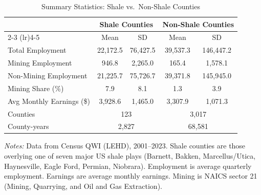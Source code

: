 \begin{table}[H]
\centering
\caption{Summary Statistics: Shale vs.\ Non-Shale Counties}
\begin{threeparttable}
\begin{tabular}{lcccc}
\toprule
 & \multicolumn{2}{c}{Shale Counties} & \multicolumn{2}{c}{Non-Shale Counties} \\
\cmidrule(lr){2-3} \cmidrule(lr){4-5}
 & Mean & SD & Mean & SD \\
\midrule
Total Employment & 22,172.5 & 76,427.5 & 39,537.3 & 146,447.2 \\
Mining Employment & 946.8 & 2,265.0 & 165.4 & 1,578.1 \\
Non-Mining Employment & 21,225.7 & 75,726.7 & 39,371.8 & 145,945.0 \\
Mining Share (\%) & 7.9 & 8.1 & 1.3 & 3.9 \\
Avg Monthly Earnings (\$) & 3,928.6 & 1,465.0 & 3,307.9 & 1,071.3 \\
\midrule
Counties & \multicolumn{2}{c}{123} & \multicolumn{2}{c}{3,017} \\
County-years & \multicolumn{2}{c}{2,827} & \multicolumn{2}{c}{68,581} \\
\bottomrule
\end{tabular}
\begin{tablenotes}[flushleft]
\small
\item \textit{Notes:} Data from Census QWI (LEHD), 2001--2023. Shale counties are those overlying one of seven major US shale plays (Barnett, Bakken, Marcellus/Utica, Haynesville, Eagle Ford, Permian, Niobrara). Employment is average quarterly employment. Earnings are average monthly earnings. Mining is NAICS sector 21 (Mining, Quarrying, and Oil and Gas Extraction).
\end{tablenotes}
\end{threeparttable}
\label{tab:summary}
\end{table}
